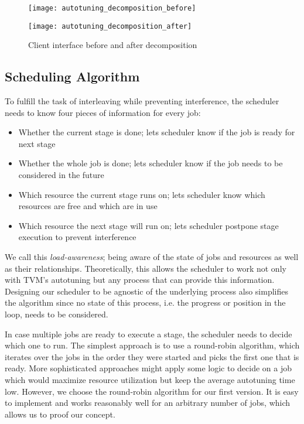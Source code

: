 \begin{figure}
	\begin{minipage}[b]{.5\textwidth}
		\centering\texttt{[image: autotuning\_decomposition\_before]}
		\label{fig:autotuning-decomposition-before}
	\end{minipage}%
	\begin{minipage}[b]{.5\textwidth}
		\centering\texttt{[image: autotuning\_decomposition\_after]}
		\label{fig:autotuning-decomposition-after}
	\end{minipage}
	\caption{Client interface before and after decomposition}
	\label{fig:autotuning-decomposition}
\end{figure}

\subsection{Scheduling Algorithm}
To fulfill the task of interleaving while preventing interference, the scheduler needs to know four pieces of information for every job:
\begin{itemize}
	\item Whether the current stage is done; lets scheduler know if the job is ready for next stage
	\item Whether the whole job is done; lets scheduler know if the job needs to be considered in the future
	\item Which resource the current stage runs on; lets scheduler know which resources are free and which are in use
	\item Which resource the next stage will run on; lets scheduler postpone stage execution to prevent interference
\end{itemize}
We call this \textit{load-awareness}; being aware of the state of jobs and resources as well as their relationships. Theoretically, this allows the scheduler to work not only with TVM's autotuning but any process that can provide this information. Designing our scheduler to be agnostic of the underlying process also simplifies the algorithm since no state of this process, i.e. the progress or position in the loop, needs to be considered.

In case multiple jobs are ready to execute a stage, the scheduler needs to decide which one to run. The simplest approach is to use a round-robin algorithm, which iterates over the jobs in the order they were started and picks the first one that is ready. More sophisticated approaches might apply some logic to decide on a job which would maximize resource utilization but keep the average autotuning time low. However, we choose the round-robin algorithm for our first version. It is easy to implement and works reasonably well for an arbitrary number of jobs, which allows us to proof our concept.

